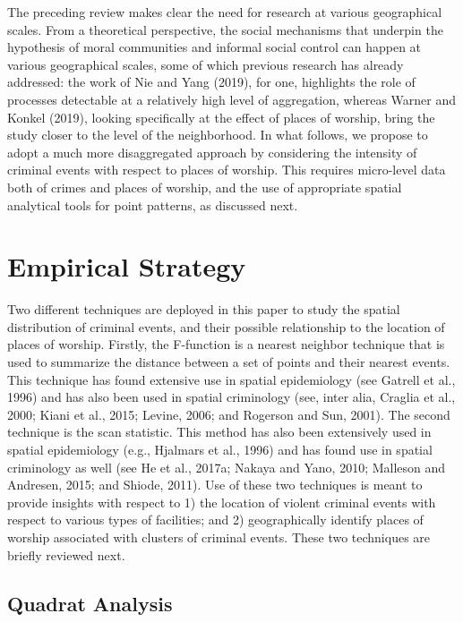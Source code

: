 \documentclass[smallextended]{svjour3}       %
\begin{document}
The preceding review makes clear the need for research at various
geographical scales. From a theoretical perspective, the social
mechanisms that underpin the hypothesis of moral communities and
informal social control can happen at various geographical scales, some
of which previous research has already addressed: the work of Nie and
Yang (2019), for one, highlights the role of processes detectable at a
relatively high level of aggregation, whereas Warner and Konkel (2019),
looking specifically at the effect of places of worship, bring the study
closer to the level of the neighborhood. In what follows, we propose to
adopt a much more disaggregated approach by considering the intensity of
criminal events with respect to places of worship. This requires
micro-level data both of crimes and places of worship, and the use of
appropriate spatial analytical tools for point patterns, as discussed
next.

\hypertarget{methods}{%
\section{Empirical Strategy}\label{methods}}

Two different techniques are deployed in this paper to study the spatial
distribution of criminal events, and their possible relationship to the
location of places of worship. Firstly, the F-function is a nearest
neighbor technique that is used to summarize the distance between a set
of points and their nearest events. This technique has found extensive
use in spatial epidemiology (see Gatrell et al., 1996) and has also been
used in spatial criminology (see, inter alia, Craglia et al., 2000;
Kiani et al., 2015; Levine, 2006; and Rogerson and Sun, 2001). The
second technique is the scan statistic. This method has also been
extensively used in spatial epidemiology (e.g., Hjalmars et al., 1996)
and has found use in spatial criminology as well (see He et al., 2017a;
Nakaya and Yano, 2010; Malleson and Andresen, 2015; and Shiode, 2011).
Use of these two techniques is meant to provide insights with respect to
1) the location of violent criminal events with respect to various types
of facilities; and 2) geographically identify places of worship
associated with clusters of criminal events. These two techniques are
briefly reviewed next.

\hypertarget{quadrat-analysis}{%
\subsection{Quadrat Analysis}\label{quadrat-analysis}}
\end{document}
